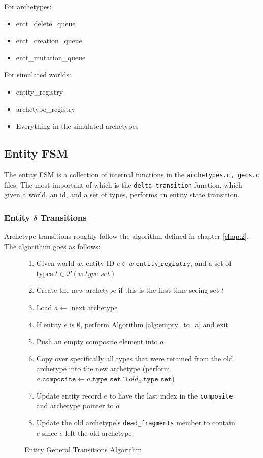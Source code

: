 For archetypes:
\begin{itemize}
    \item entt\_delete\_queue
    \item entt\_creation\_queue
    \item entt\_mutation\_queue
\end{itemize}

For simulated worlds:
\begin{itemize}
    \item entity\_registry
    \item archetype\_registry
    \item Everything in the simulated archetypes
\end{itemize}

\subsection{Entity FSM}
The entity FSM is a collection of internal functions in the \texttt{archetypes.c, gecs.c} files. The most important of which is the \texttt{delta\_transition} function, which given a world, an id, and a set of types, performs an entity state transition.

\subsubsection{Entity $\delta$ Transitions}
Archetype transitions roughly follow the algorithm defined in chapter \ref{chap:2}. The algorithim goes as follows:

\begin{figure}[htbp]
    \begin{enumerate}
        \item Given world $w$, entity ID $e \in w.\texttt{entity\_registry}$, and a set of types $t \in \mathcal{P}(w.type\_set)$
        \item Create the new archetype if this is the first time seeing set $t$
        \item Load $a \leftarrow$ next archetype
        \item If entity $e$ is $\emptyset$, perform Algorithm \ref{alg:empty_to_a} and exit
        \item Push an empty composite element into $a$
        \item Copy over specifically all types that were retained from the old archetype into the new archetype (perform $a.\texttt{composite} \leftarrow a.\texttt{type\_set} \cap old_a.\texttt{type\_set}$)
        \item Update entity record $e$ to have the last index in the \texttt{composite} and archetype pointer to $a$
        \item Update the old archetype's \texttt{dead\_fragments} member to contain $e$ since $e$ left the old archetype.
    \end{enumerate} 
    \caption{Entity General Transitions Algorithm}
    \label{alg:transition}
\end{figure}

